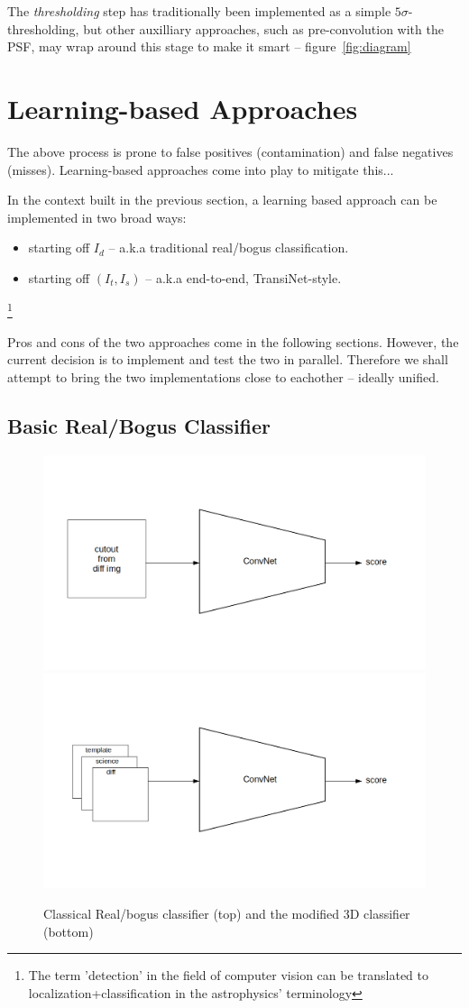 The \emph{thresholding} step has traditionally been implemented as a simple $5\sigma$-thresholding, but other auxilliary approaches, such as pre-convolution with the PSF, may wrap around this stage to make it smart -- figure~\ref{fig:diagram}


\section{Learning-based Approaches}
\label{sec:learning}
The above process is prone to false positives (contamination) and false negatives (misses). Learning-based approaches come into play to mitigate this...

In the context built in the previous section, a learning based approach can be implemented in two broad ways:
\begin{itemize}
\item starting off $I_d$ -- a.k.a traditional real/bogus classification.
\item starting off $(I_t,I_s)$ -- a.k.a end-to-end, TransiNet-style.
\end{itemize}

\footnote{The term 'detection' in the field of computer vision can be translated to localization+classification in the astrophysics' terminology}


Pros and cons of the two approaches come in the following sections. However, the current decision is to implement and test the two in parallel. Therefore we shall attempt to bring the two implementations close to eachother -- ideally unified.


\subsection{Basic Real/Bogus Classifier}

\begin{figure}[h]
  \centering
  \includegraphics[width=.6\textwidth]{material/rb-classifier}
  \includegraphics[width=.6\textwidth]{material/rb-classifier-mod}
  \caption{Classical Real/bogus classifier (top) and the modified 3D classifier (bottom)}
  \label{fig:rbdiagram}
\end{figure}

